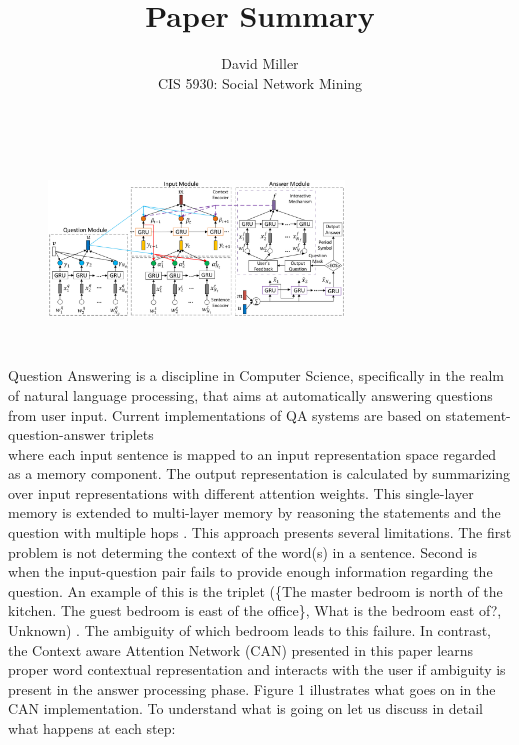 \documentclass[12pt]{article}
\theoremstyle{remark}
\begin{document}
 
\title{Paper Summary}
\author{David Miller \\ 
CIS 5930: Social Network Mining} 

\maketitle

\begin{figure}
	\vspace{-15pt}
	\hspace{0pt}
	\includegraphics[height=5.25cm,width=0.7\textwidth]{Fig1.eps}
	\caption{}
	\vspace{-14pt}
\end{figure}
Question Answering is a discipline in Computer Science, specifically in the realm of natural language processing, that aims at automatically answering questions from user input. Current implementations of QA systems are based on statement-question-answer triplets \\ where each input sentence is mapped to an input representation space regarded as a memory component. The output representation is calculated by summarizing over input representations with different attention weights. This
single-layer memory is extended to multi-layer memory by reasoning the statements and the question with multiple hops \cite{paper}. This approach presents several limitations. The first problem is not determing the context of the word(s) in a sentence. Second is when the input-question pair fails to provide enough information regarding the question. An example of this is the triplet (\{The master bedroom is north of the kitchen. The guest bedroom is east of the office\}, What is the bedroom east of?, Unknown) \cite{paper}. The ambiguity of which bedroom leads to this failure. In contrast, the Context aware Attention Network (CAN) presented in this paper learns proper word contextual representation and interacts with the user if ambiguity is present in the answer processing phase. Figure 1 illustrates what goes on in the CAN implementation. To understand what is going on let us discuss in detail what happens at each step: 
\end{document}
